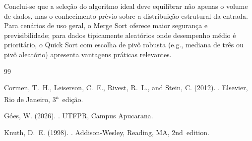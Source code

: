 \documentclass[12pt]{article}
\begin{document}
Conclui-se que a seleção do algoritmo ideal deve equilibrar não apenas o
volume de dados, mas o conhecimento prévio sobre a distribuição estrutural
da entrada. Para cenários de uso geral, o Merge Sort oferece maior segurança
e previsibilidade; para dados tipicamente aleatórios onde desempenho médio é
prioritário, o Quick Sort com escolha de pivô robusta (e.g., mediana de três
ou pivô aleatório) apresenta vantagens práticas relevantes.

\begin{thebibliography}{99}

Cormen, T.~H., Leiserson, C.~E., Rivest, R.~L., and Stein, C. (2012).
.
\newblock Elsevier, Rio de Janeiro, 3\textsuperscript{a}~edição.

Góes, W. (2026).
.
\newblock UTFPR, Campus Apucarana.

Knuth, D.~E. (1998).
.
\newblock Addison-Wesley, Reading, MA, 2nd~edition.

\end{thebibliography}
\end{document}
